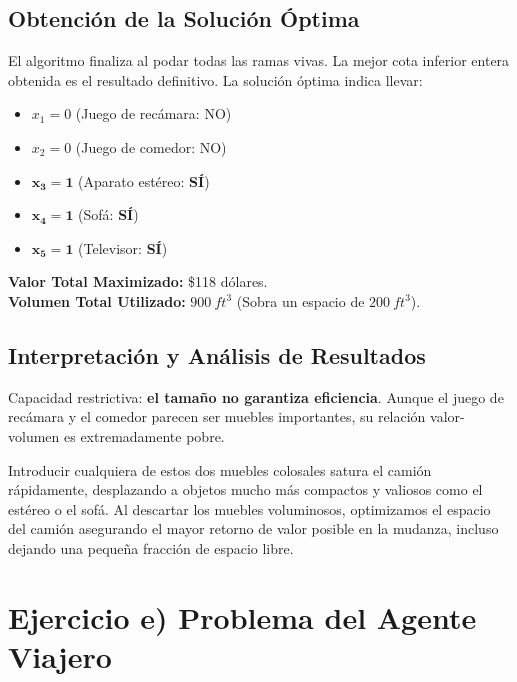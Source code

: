 \documentclass[10pt,a4paper]{article}
\begin{document}
\subsection{Obtención de la Solución Óptima}
El algoritmo finaliza al podar todas las ramas vivas. La mejor cota inferior entera obtenida es el resultado definitivo.
La solución óptima indica llevar:
\begin{itemize}
    \item $x_1 = 0$ (Juego de recámara: NO)
    \item $x_2 = 0$ (Juego de comedor: NO)
    \item $\mathbf{x_3 = 1}$ (Aparato estéreo: \textbf{SÍ})
    \item $\mathbf{x_4 = 1}$ (Sofá: \textbf{SÍ})
    \item $\mathbf{x_5 = 1}$ (Televisor: \textbf{SÍ})
\end{itemize}
\textbf{Valor Total Maximizado:} \$118 dólares. \\
\textbf{Volumen Total Utilizado:} $900 \ ft^3$ (Sobra un espacio de $200 \ ft^3$).

\subsection{Interpretación y Análisis de Resultados}
Capacidad restrictiva: \textbf{el tamaño no garantiza eficiencia}. 
Aunque el juego de recámara y el comedor parecen ser muebles importantes, 
su relación valor-volumen es extremadamente pobre. 

Introducir cualquiera de estos dos muebles colosales satura el camión rápidamente, desplazando a objetos mucho más compactos y valiosos como el estéreo o el sofá. Al descartar los muebles voluminosos, optimizamos el espacio del camión asegurando el mayor retorno de valor posible en la mudanza, incluso dejando una pequeña fracción de espacio libre.

\newpage


\section{Ejercicio e) Problema del Agente Viajero }
\end{document}
